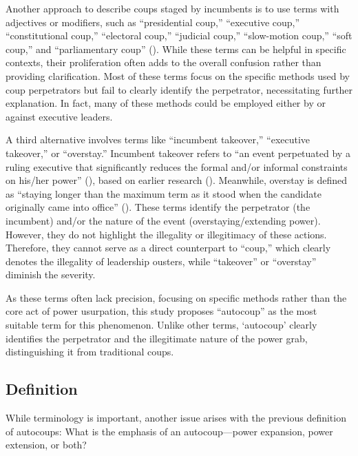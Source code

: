 \documentclass[
  12pt,
]{report}
\begin{document}
Another approach to describe coups staged by incumbents is to use terms
with adjectives or modifiers, such as ``presidential coup,'' ``executive
coup,'' ``constitutional coup,'' ``electoral coup,'' ``judicial coup,''
``slow-motion coup,'' ``soft coup,'' and ``parliamentary coup''
().
While these terms can be helpful in specific contexts, their
proliferation often adds to the overall confusion rather than providing
clarification. Most of these terms focus on the specific methods used by
coup perpetrators but fail to clearly identify the perpetrator,
necessitating further explanation. In fact, many of these methods could
be employed either by or against executive leaders.

A third alternative involves terms like ``incumbent takeover,''
``executive takeover,'' or ``overstay.'' Incumbent takeover refers to
``an event perpetuated by a ruling executive that significantly reduces
the formal and/or informal constraints on his/her power''
(), based on
earlier research (). Meanwhile,
overstay is defined as ``staying longer than the maximum term as it
stood when the candidate originally came into office''
(). These terms identify the perpetrator (the incumbent) and/or the
nature of the event (overstaying/extending power). However, they do not
highlight the illegality or illegitimacy of these actions. Therefore,
they cannot serve as a direct counterpart to ``coup,'' which clearly
denotes the illegality of leadership ousters, while ``takeover'' or
``overstay'' diminish the severity.

As these terms often lack precision, focusing on specific methods rather
than the core act of power usurpation, this study proposes ``autocoup''
as the most suitable term for this phenomenon. Unlike other terms,
`autocoup' clearly identifies the perpetrator and the illegitimate
nature of the power grab, distinguishing it from traditional coups.

\subsection{Definition}\label{definition}

While terminology is important, another issue arises with the previous
definition of autocoups: What is the emphasis of an autocoup---power
expansion, power extension, or both?
\end{document}
